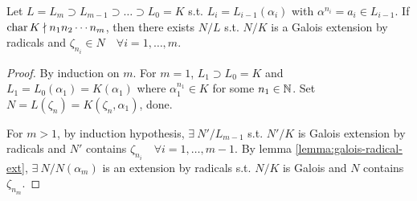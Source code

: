 \begin{lemma} \label{lemma:radical-ext-chain-galois}
  Let $L = L_m \supset L_{m-1} \supset \dots \supset L_0 = K$ s.t.
  $L_i = L_{i-1}(\alpha_i)$ with $\alpha^{n_i} = a_i \in L_{i-1}$.
  If $\operatorname{char} K \nmid n_1n_2\cdots n_m$, then there exists $N/L$ s.t.
  $N/K$ is a Galois extension by radicals and $\zeta_{n_i} \in N \quad
  \forall i = 1, \dots, m$.

  \begin{proof}
    By induction on $m$. For $m = 1$, $L_1 \supset L_0 = K$ and
    $L_1 = L_0(\alpha_1) = K(\alpha_1)$ where $\alpha_1^{n_1} \in K$ for some
    $n_1\in \mathbb{N}$. Set $N = L(\zeta_n) = K(\zeta_n, \alpha_1)$, done.

    For $m > 1$, by induction hypothesis, $\exists\: N'/L_{m-1}$ s.t.
    $N'/K$ is Galois extension by radicals and $N'$ contains
    $\zeta_{n_i} \quad \forall i = 1, \dots, m-1$.
    By lemma \ref{lemma:galois-radical-ext}, $\exists\: N/N(\alpha_m)$ is
    an extension by radicals s.t. $N/K$ is Galois and $N$ contains $\zeta_{n_m}$.
  \end{proof}
\end{lemma}

